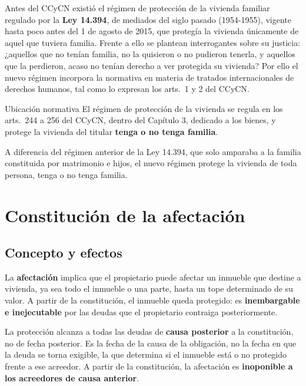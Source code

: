 \documentclass[12pt,oneside]{book}
\begin{document}
Antes del CCyCN existió el régimen de protección de la vivienda familiar regulado por la \textbf{Ley 14.394}, de mediados del siglo pasado (1954-1955), vigente hasta poco antes del 1 de agosto de 2015, que protegía la vivienda únicamente de aquel que tuviera familia. Frente a ello se plantean interrogantes sobre su justicia: ¿aquellos que no tenían familia, no la quisieron o no pudieron tenerla, y aquellos que la perdieron, acaso no tenían derecho a ver protegida su vivienda? Por ello el nuevo régimen incorpora la normativa en materia de tratados internacionales de derechos humanos, tal como lo expresan los arts.~1 y 2 del CCyCN.

\begin{definition}{Ubicación normativa}
El régimen de protección de la vivienda se regula en los arts.~244 a 256 del CCyCN, dentro del Capítulo 3, dedicado a los bienes, y protege la vivienda del titular \textbf{tenga o no tenga familia}.
\end{definition}

\begin{important}
A diferencia del régimen anterior de la Ley 14.394, que solo amparaba a la familia constituida por matrimonio e hijos, el nuevo régimen protege la vivienda de toda persona, tenga o no tenga familia.
\end{important}

\section{Constitución de la afectación}

\subsection{Concepto y efectos}

La \textbf{afectación} implica que el propietario puede afectar un inmueble que destine a vivienda, ya sea todo el inmueble o una parte, hasta un tope determinado de su valor. A partir de la constitución, el inmueble queda protegido: es \textbf{inembargable e inejecutable} por las deudas que el propietario contraiga posteriormente.

\begin{important}
La protección alcanza a todas las deudas de \textbf{causa posterior} a la constitución, no de fecha posterior. Es la fecha de la causa de la obligación, no la fecha en que la deuda se torna exigible, la que determina si el inmueble está o no protegido frente a ese acreedor. A partir de la constitución, la afectación es \textbf{inoponible a los acreedores de causa anterior}.
\end{important}
\end{document}
